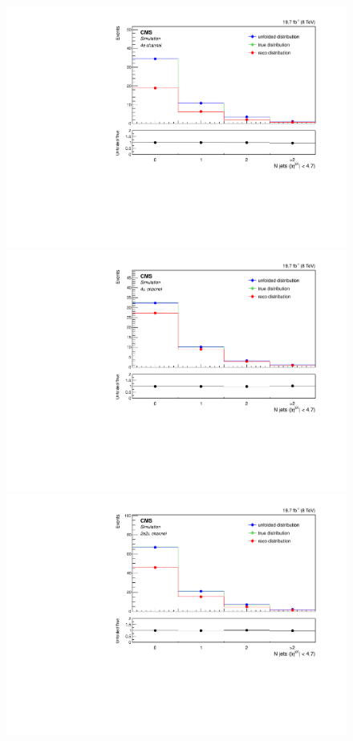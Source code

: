 \begin{figure}[hbtp]
\begin{center}
    \includegraphics[width=0.8\cmsFigWidth]{Figures/Unfolding/MCTests/Jets_ZZTo4e_MadMatrix_MadDistr_HalfSample_fr}     
    \includegraphics[width=0.8\cmsFigWidth]{Figures/Unfolding/MCTests/Jets_ZZTo4m_MadMatrix_MadDistr_HalfSample_fr}     
    \includegraphics[width=0.8\cmsFigWidth]{Figures/Unfolding/MCTests/Jets_ZZTo2e2m_MadMatrix_MadDistr_HalfSample_fr}     

\end{center}
\end{figure}
